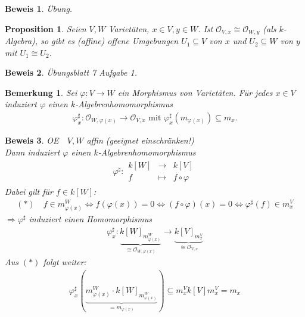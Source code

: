 \documentclass[a4paper,12pt]{report}
\theoremstyle{break}
\newtheorem{Bem}[Def]{Bemerkung}
\newtheorem{Prop}[Def]{Proposition}
\theoremstyle{nonumberbreak}
\theoremstyle{nonumberplain}
\newtheorem{Bew}{Beweis}
\newcommand{\Abb}[5]{\ensuremath{#1:\begin{array}{ccc} #2 & \longrightarrow & #3 \\ #4 & \longmapsto & #5 \end{array}}}
\renewcommand{\OE}{O\!\!E~}
\begin{document}
\begin{Bew}
  Übung.
\end{Bew}
\begin{Prop}
  \label{prop:14.3}
  Seien $V,W$ Varietäten, $x\in V, y\in W$. Ist $\mathcal{O}_{V,x}\cong\mathcal{O}_{W,y}$ (als $k$-Algebra), so gibt es (affine)
  offene Umgebungen $U_1\subseteq V$ von $x$ und $U_2\subseteq W$ von $y$ mit $U_1\cong U_2$.
\end{Prop}
\begin{Bew}
  Übungsblatt 7 Aufgabe 1.
\end{Bew}
\begin{Bem}
  \label{bem:14.4}
  Sei $\varphi :V\longrightarrow W$ ein Morphismus von Varietäten. Für jedes $x\in V$ induziert $\varphi$ einen
  $k$-Algebrenhomomorphismus
  \begin{align*}
    \varphi_x^\sharp:\mathcal{O}_{W,\varphi(x)}\longrightarrow \mathcal{O}_{V,x} \text{ mit } \varphi_x^\sharp(m_{\varphi(x)})\subseteq m_x.
  \end{align*}
\end{Bem}
\begin{Bew}
  \OE \ $V,W$ affin (geeignet einschränken!) \\ Dann induziert $\varphi$ einen $k$-Algebrenhomomorphismus
  \begin{align*}
    \Abb{\varphi^\sharp}{k[W]}{k[V]}{f}{f\circ\varphi}
  \end{align*}
  Dabei gilt für $f\in k[W]$:
  \begin{align*}
    (*) \quad f\in m_{\varphi(x)}^{W}\Leftrightarrow f(\varphi(x))=0\Leftrightarrow (f\circ\varphi)(x)=0\Leftrightarrow\varphi^\sharp(f)\in m_x^V
  \end{align*}
  $\Rightarrow\varphi^\sharp$ induziert einen Homomorphismus
  \begin{align*}
    \varphi_x^\sharp:\underbrace{k[W]_{m_{\varphi(x)}^W}}_{\cong\mathcal{O}_{W,\varphi(x)}}\longrightarrow \underbrace{k[V]_{m_x^V}}_{\cong\mathcal{O}_{V,x}}
  \end{align*}
  Aus $(*)$ folgt weiter:
  \begin{align*}
    \varphi_x^\sharp ( \underbrace{m_{\varphi(x)}^W\cdot k[W]_{m_{\varphi(x)}^W}}_{=m_{\varphi(x)}} ) \subseteq m_x^V k[V] m_x^V = m_x
  \end{align*}
\end{Bew}
\end{document}
